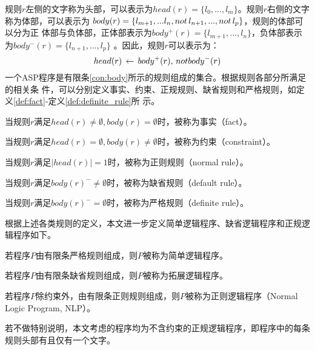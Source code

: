 规则$r$左侧的文字称为头部，可以表示为$head(r) = \{ l_0,...,l_m \}$。规则$r$右侧的文字称为体部，可以表示为
$body(r) = \{ l_{m+1},...l_n,not \thinspace l_{n+1},..., not \thinspace l_p \}$，规则的体部可以分为正
体部与负体部，正体部表示为$body^+(r) = \{ l_{m+1},...,l_n \}$，负体部表示为$body^-(r)=\{ l_{n+1},...,l_p \}$
。因此，规则$r$可以表示为：
\begin{equation}
    head(r) \thinspace \leftarrow \thinspace body^+(r), \thinspace not body^-(r) \label{con:body}
\end{equation}
一个ASP程序是有限条\eqref{con:body}所示的规则组成的集合。根据规则各部分所满足的相关条
件，可以分别定义事实、约束、正规规则、缺省规则和严格规则，如定义\eqref{def:fact}-定义\eqref{def:definite_rule}所
示。

\begin{definition}[事实]
当规则$r$满足$head(r)\neq \emptyset, body(r) = \emptyset$时，被称为事实（fact）。\label{def:fact}
\end{definition}
\begin{definition}[约束]
当规则$r$满足$head(r)= \emptyset, body(r) \neq \emptyset$时，被称为约束（constraint）。
\end{definition}
\begin{definition}[正则规则]
    当规则$r$满足$|head(r)|=1$时，被称为正则规则（normal rule）。
\end{definition}
\begin{definition}[缺省规则]
    当规则$r$满足$body(r)^-\neq \emptyset$时，被称为缺省规则（default rule）。
\end{definition}
\begin{definition}[严格规则]
    当规则$r$满足$body(r)^- = \emptyset$时，被称为严格规则（definite rule）。\label{def:definite_rule}
\end{definition}
根据上述各类规则的定义，本文进一步定义简单逻辑程序、缺省逻辑程序和正规逻辑程序如下。
\begin{definition}[简单逻辑程序]
    若程序$P$由有限条严格规则组成，则$P$被称为简单逻辑程序。
\end{definition}
\begin{definition}[拓展逻辑程序]
    若程序$P$由有限条缺省规则组成，则$P$被称为拓展逻辑程序。
\end{definition}
\begin{definition}[正则逻辑程序]
    若程序$P$除约束外，由有限条正则规则组成，则$P$被称为正则逻辑程序（Normal Logic Program, NLP）。
\end{definition}
若不做特别说明，本文考虑的程序均为不含约束的正规逻辑程序，即程序中的每条规则头部有且仅有一个文字。
